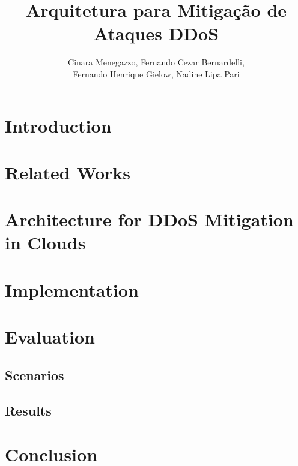 \documentclass[a4paper, 12pt]{article}
\begin{document}
\title{Arquitetura para Mitigação de Ataques DDoS}

\author{
Cinara Menegazzo,
Fernando Cezar Bernardelli, \\
Fernando Henrique Gielow,
Nadine Lipa Pari
}
   

   
\address{Departamento de Informática -- Universidade Federal do Paraná\\
NR2 - Núcleo de Redes Sem Fio e Redes Avançadas\\
  Caixa Postal 19.081 -- 81.531-980 -- Curitiba -- PR -- Brasil
}     

\maketitle


\begin{resumo}

\end{resumo}



\section{Introduction}


\section{Related Works}


\section{Architecture for DDoS Mitigation in Clouds}


\section{Implementation}


\section{Evaluation}


\subsection{Scenarios}


\subsection{Results}


\section{Conclusion}



% 



\end{document}
